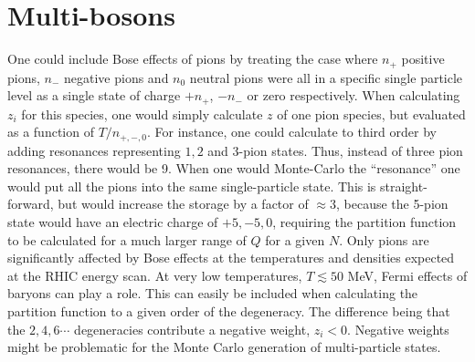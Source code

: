 \documentclass[letterpaper,aps,showpacs,floatfix,10pt,prc]{revtex4-1}
\begin{document}
\section{Multi-bosons}

One could include Bose effects of pions by treating the case where $n_+$ positive pions, $n_-$ negative pions and $n_0$ neutral pions were all in a specific single particle level as a single state of charge $+n_+$, $-n_-$ or zero respectively. When calculating $z_i$ for this species, one would simply calculate $z$ of one pion species, but evaluated as a function of $T/n_{+,-,0}$. For instance, one could calculate to third order by adding resonances representing $1,2$ and 3-pion states. Thus, instead of three pion resonances, there would be 9. When one would Monte-Carlo the ``resonance'' one would put all the pions into the same single-particle state. This is straight-forward, but would increase the storage by a factor of $\approx 3$, because the 5-pion state would have an electric charge of $+5,-5,0$, requiring the partition function to be calculated for a much larger range of $Q$ for a given $N$. Only pions are significantly affected by Bose effects at the temperatures and densities expected at the RHIC energy scan. At very low temperatures, $T\lesssim 50$ MeV, Fermi effects of baryons can play a role. This can easily be included when calculating the partition function to a given order of the degeneracy. The difference being that the $2,4,6\cdots$ degeneracies contribute a negative weight, $z_i<0$. Negative weights might be problematic for the Monte Carlo generation of multi-particle states.  


%
\end{document}
